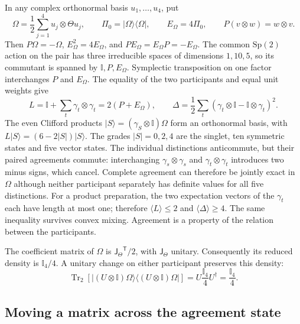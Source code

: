 \documentclass[aps,prx,onecolumn,10pt,notitlepage,nofootinbib,longbibliography]{revtex4-2}
\numberwithin{equation}{section}
\numberwithin{table}{section}
\newcommand{\Id}{\mathbb I}
\begin{document}
In any complex orthonormal basis $u_1,\ldots,u_4$, put
\begin{equation}
 \Omega=\frac12\sum_{j=1}^4u_j\otimes\Theta u_j,\qquad
 \Pi_0=|\Omega\rangle\langle\Omega|,\qquad E_\Omega=4\Pi_0,
 \qquad P(v\otimes w)=w\otimes v.
 \label{eq:agreementstate}
\end{equation}
Then $P\Omega=-\Omega$, $E_\Omega^2=4E_\Omega$, and $PE_\Omega=E_\Omega P=-E_\Omega$. The common $\mathrm{Sp}(2)$ action on the pair has three irreducible spaces of dimensions $1,10,5$, so its commutant is spanned by $\Id,P,E_\Omega$. Symplectic transposition on one factor interchanges $P$ and $E_\Omega$. The equality of the two participants and equal unit weights give
\begin{equation}
 L=\Id+\sum_t\gamma_t\otimes\gamma_t=2(P+E_\Omega),\qquad
 \Delta=\frac12\sum_t(\gamma_t\otimes\Id-\Id\otimes\gamma_t)^2.
 \label{eq:paircomparison}
\end{equation}
The even Clifford products $\lvert S\rangle=(\gamma_S\otimes\Id)\Omega$ form an orthonormal basis, with $L\lvert S\rangle=(6-2|S|)\lvert S\rangle$. The grades $|S|=0,2,4$ are the singlet, ten symmetric states and five vector states. The individual distinctions anticommute, but their paired agreements commute: interchanging $\gamma_s\otimes\gamma_s$ and $\gamma_t\otimes\gamma_t$ introduces two minus signs, which cancel. Complete agreement can therefore be jointly exact in $\Omega$ although neither participant separately has definite values for all five distinctions. For a product preparation, the two expectation vectors of the $\gamma_t$ each have length at most one; therefore $\langle L\rangle\leq2$ and $\langle\Delta\rangle\geq4$. The same inequality survives convex mixing. Agreement is a property of the relation between the participants.

The coefficient matrix of $\Omega$ is ${\mathsf J_\Theta}^{\mathsf T}/2$, with ${\mathsf J_\Theta}$ unitary. Consequently its reduced density is $\Id_4/4$. A unitary change on either participant preserves this density:
\begin{equation}
 \operatorname{Tr}_2\!\left[|(U\otimes\Id)\Omega\rangle
 \langle(U\otimes\Id)\Omega|\right]
 =U\frac{\Id_4}{4}U^\dagger=\frac{\Id_4}{4}.
 \label{eq:pairmarginal}
\end{equation}

\subsection{Moving a matrix across the agreement state}
\label{sec:crossingidentity}
\end{document}
